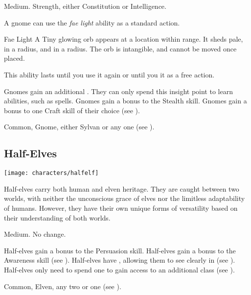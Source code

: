          Medium.
          Strength, either  Constitution or  Intelligence.
        \begin{raggeditemize}
             A gnome can use the \textit{fae light} ability as a standard action.
                \begin{activeability}{Fae Light}
                    \rankline
                    A Tiny glowing orb appears at a location within \rngmed range.
                    It sheds pale,  in a \areasmall radius, and  in a \areamed radius.
                    The orb is intangible, and cannot be moved once placed.

                    This ability lasts until you use it again or until you  it as a free action.
                \end{activeability}
             Gnomes gain an additional .
                They can only spend this insight point to learn \magical abilities, such as spells.
             Gnomes gain a  bonus to the Stealth skill.
             Gnomes gain a  bonus to one Craft skill of their choice (see ).
        \end{raggeditemize}
         Common, Gnome, either Sylvan or any one  (see ).

    \subsection{Half-Elves}\label{Half-Elves}
        \texttt{[image: characters/halfelf]}

        Half-elves carry both human and elven heritage.
        They are caught between two worlds, with neither the unconscious grace of elves nor the limitless adaptability of humans.
        However, they have their own unique forms of versatility based on their understanding of both worlds.

         Medium.
         No change.
        \begin{raggeditemize}
             Half-elves gain a  bonus to the Persuasion skill.
             Half-elves gain a  bonus to the Awareness skill (see ).
             Half-elves have , allowing them to see clearly in  (see ).
             Half-elves only need to spend one  to gain access to an additional class (see ).
        \end{raggeditemize}
         Common, Elven, any two  or one  (see ).

